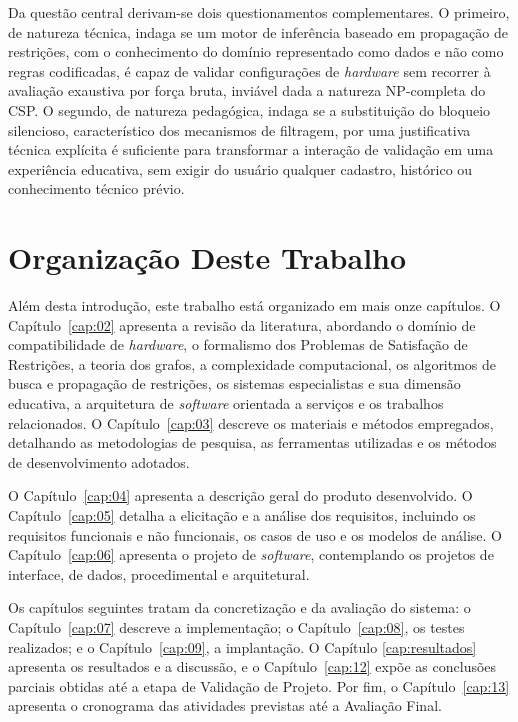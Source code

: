 Da questão central derivam-se dois questionamentos complementares. O primeiro, de natureza técnica, indaga se um motor de inferência baseado
em propagação de restrições, com o conhecimento do domínio representado como dados e não como regras codificadas, é capaz de validar
configurações de \textit{hardware} sem recorrer à avaliação exaustiva por força bruta, inviável dada a natureza NP-completa do CSP. O segundo,
de natureza pedagógica, indaga se a substituição do bloqueio silencioso, característico dos mecanismos de filtragem, por uma justificativa
técnica explícita é suficiente para transformar a interação de validação em uma experiência educativa, sem exigir do usuário qualquer
cadastro, histórico ou conhecimento técnico prévio.

\section{Organização Deste Trabalho}
Além desta introdução, este trabalho está organizado em mais onze capítulos. O Capítulo~\ref{cap:02} apresenta a revisão da literatura,
abordando o domínio de compatibilidade de \textit{hardware}, o formalismo dos Problemas de Satisfação de Restrições, a teoria dos grafos, a
complexidade computacional, os algoritmos de busca e propagação de restrições, os sistemas especialistas e sua dimensão educativa, a
arquitetura de \textit{software} orientada a serviços e os trabalhos relacionados. O Capítulo~\ref{cap:03} descreve os materiais e métodos
empregados, detalhando as metodologias de pesquisa, as ferramentas utilizadas e os métodos de desenvolvimento adotados.

O Capítulo~\ref{cap:04} apresenta a descrição geral do produto desenvolvido. O Capítulo~\ref{cap:05} detalha a elicitação e a análise dos
requisitos, incluindo os requisitos funcionais e não funcionais, os casos de uso e os modelos de análise. O Capítulo~\ref{cap:06} apresenta o
projeto de \textit{software}, contemplando os projetos de interface, de dados, procedimental e arquitetural.

Os capítulos seguintes tratam da concretização e da avaliação do sistema: o Capítulo~\ref{cap:07} descreve a implementação; o
Capítulo~\ref{cap:08}, os testes realizados; e o Capítulo~\ref{cap:09}, a implantação. O Capítulo \ref{cap:resultados} apresenta os resultados e a
discussão, e o Capítulo~\ref{cap:12} expõe as conclusões parciais obtidas até a etapa de Validação de Projeto. Por fim, o
Capítulo~\ref{cap:13} apresenta o cronograma das atividades previstas até a Avaliação Final.